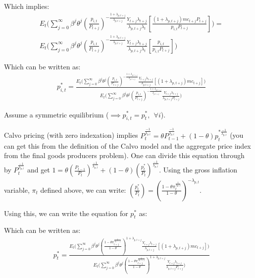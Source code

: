 Which implies:
\begin{equation}
\begin{split}
 &   E_{t}\Biggl(\sum_{j=0}^{\infty}\beta^{j}\theta^{j}\left(\frac{p_{i,t}}{P_{t+j}}\right)^{-\frac{1+\lambda_{p,t+j}}{\lambda_{p,t+j}}}\frac{Y_{t+j}\lambda_{t+j}}{\lambda_{p,t+j}\lambda_{t}}\left[\frac{(1+\lambda_{p,t+j})mc_{t+j}P_{t+j}}{p_{i,t}P_{t+j}}\right]\Biggr) =  \\
 & E_{t}\Biggl(\sum_{j=0}^{\infty}\beta^{j}\theta^{j}\left(\frac{p_{i,t}}{P_{t+j}}\right)^{-\frac{1+\lambda_{p,t+j}}{\lambda_{p,t+j}}}\frac{Y_{t+j}\lambda_{t+j}}{\lambda_{p,t+j}\lambda_{t}}\left[\frac{p_{i,t}}{p_{i,t}P_{t+j}}\right]\Biggr)
\end{split}
\end{equation}

Which can be written as:
\begin{equation}
\begin{split}
 &   p_{i,t}^{*}=\frac{E_{t}\Biggl(\sum_{j=0}^{\infty}\beta^{j}\theta^{j}\left(\frac{p_{i,t}}{P_{t+j}}\right)^{-\frac{1+\lambda_{p,t+j}}{\lambda_{p,t+j}}}\frac{Y_{t+j}\lambda_{t+j}}{\lambda_{p,t+j}}\left[(1+\lambda_{p,t+j})mc_{t+j}\right]\Biggr)}{E_{t}\Biggl(\sum_{j=0}^{\infty}\beta^{j}\theta^{j}\left(\frac{p_{i,t}}{P_{t+j}}\right)^{-\frac{1+\lambda_{p,t+j}}{\lambda_{p,t+j}}}\frac{Y_{t+j}\lambda_{t+j}}{\lambda_{p,t+j}P_{t+j}}\Biggr)}
\end{split}
\end{equation}

Assume a symmetric equilibrium ($\implies p_{i,t}^{*}=p_{t}^{*}, \ \ \forall i$).

Calvo pricing (with zero indexation) implies $P_{t}^{\frac{-1}{\lambda_{p,t}}}= \theta P_{t-1}^{\frac{-1}{\lambda_{p,t}}} +(1-\theta)p_{t}^{*\frac{-1}{\lambda_{p,t}}}$ (you can get this from the definition of the Calvo model and the aggregate price index from the final goods producers problem).  One can divide this equation through by $P_{t}^{\frac{-1}{\lambda_{p,t}}}$ and get $1=\theta \left(\frac{P_{t-1}}{P_{t}}\right)^{\frac{-1}{\lambda_{p,t}}}+(1-\theta)\left(\frac{p_{t}^{*}}{P_{t}}\right)^{\frac{-1}{\lambda_{p,t}}}$.  Using the gross inflation variable, $\pi_{t}$ defined above, we can write: $\left(\frac{p_{t}^{*}}{P_{t}}\right)=\left(\frac{1-\theta\pi_{t}^{\frac{1}{\lambda{p,t}}}}{1-\theta} \right)^{-\lambda_{p,t}}$.

Using this, we can write the equation for $p_{t}^{*}$ as:

Which can be written as:
\begin{equation}
\begin{split}
 &   p_{t}^{*}=\frac{E_{t}\Biggl(\sum_{j=0}^{\infty}\beta^{j}\theta^{j} \left(\frac{1-\theta\pi_{t+j}^{\frac{1}{\lambda{p,t+j}}}}{1-\theta} \right)^{1+\lambda_{p,t+j}} \frac{Y_{t+j}\lambda_{t+j}}{\lambda_{p,t+j}} \left[(1+\lambda_{p,t+j})mc_{t+j}\right]\Biggr)}{E_{t}\Biggl(\sum_{j=0}^{\infty}\beta^{j}\theta^{j} \left(\frac{1-\theta\pi_{t+j}^{\frac{1}{\lambda{p,t+j}}}}{1-\theta} \right)^{1+\lambda_{p,t+j}}  \frac{Y_{t+j}\lambda_{t+j}}{\lambda_{p,t+j}P_{t+j}}\Biggr)}
\end{split}
\end{equation}


